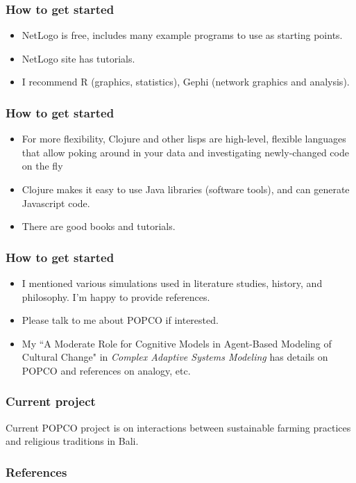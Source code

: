 \documentclass[12pt,xcolor=svgnames]{beamer}
\let\olditem\item
\renewcommand{\item}{%
\olditem\vspace{0.5pt}}
\begin{document}
\begin{frame}\frametitle{How to get started}
\begin{itemize}
\item NetLogo is free, includes many example programs to use
as starting points.
\item NetLogo site has tutorials.
\item I recommend R (graphics, statistics), Gephi
(network graphics and analysis).
\end{itemize}
\end{frame}

\begin{frame}\frametitle{How to get started}
\begin{itemize}
\item For more flexibility, Clojure and other lisps are high-level, flexible
languages that allow poking around in your data and
investigating newly-changed code on the fly
\item Clojure makes it easy to use Java libraries (software
tools), and can generate Javascript code.
\item There are good books and tutorials.
\end{itemize}
\end{frame}

\begin{frame}\frametitle{How to get started}
\begin{itemize}
\item I mentioned various simulations used in literature studies,
history, and philosophy.  I'm happy to provide references.
\item Please talk to me about POPCO if interested.\\
\item My ``A Moderate Role for Cognitive Models in Agent-Based Modeling of
Cultural Change" in {\em Complex Adaptive Systems Modeling\/} 
\citeyear{Abrams:ModerateRole} has details on POPCO and references
on analogy, etc.
\end{itemize}
\end{frame}


\begin{frame}\frametitle{Current project}
Current POPCO project is on interactions between sustainable farming practices and religious traditions in Bali.
\end{frame}

\begin{frame}%
  \titlepage%
\end{frame}

\begin{frame}[allowframebreaks]\frametitle{References}
\def\newblock{}  %

\end{frame}
\end{document}
